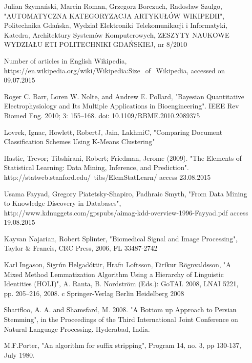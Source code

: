 \cleardoublepage
{}
{}
\begin{thebibliography}{99}

Julian Szymański, Marcin Roman, Grzegorz Borczuch, Radosław Szulgo, "AUTOMATYCZNA KATEGORYZACJA ARTYKUŁÓW WIKIPEDII", Politechnika Gdańska, Wydział Elektroniki Telekomunikacji i Informatyki, Katedra, Architektury Systemów Komputerowych, ZESZYTY NAUKOWE WYDZIAŁU ETI POLITECHNIKI GDAŃSKIEJ, nr 8/2010

Number of articles in English Wikipedia, https://en.wikipedia.org/wiki/Wikipedia:Size\_of\_Wikipedia, accessed on 09.07.2015

Roger C. Barr, Loren W. Nolte, and Andrew E. Pollard, "Bayesian Quantitative Electrophysiology and Its Multiple Applications in Bioengineering". IEEE Rev Biomed Eng. 2010; 3: 155–168.
doi:  10.1109/RBME.2010.2089375

Lovrek, Ignac, Howlett, RobertJ, Jain, LakhmiC, "Comparing Document Classification Schemes Using K-Means Clustering"

Hastie, Trevor; Tibshirani, Robert; Friedman, Jerome (2009). "The Elements of Statistical Learning: Data Mining, Inference, and Prediction". http://statweb.stanford.edu/~tibs/ElemStatLearn/ access 23.08.2015

Usama Fayyad, Gregory Piatetsky-Shapiro, Padhraic Smyth, "From Data Mining to Knowledge Discovery in Databases", http://www.kdnuggets.com/gpspubs/aimag-kdd-overview-1996-Fayyad.pdf access 19.08.2015

Kayvan Najarian, Robert Splinter, "Biomedical Signal and Image Processing", Taylor \& Francis, CRC Press, 2006, FL 33487-2742

Karl Ingason, Sigrún Helgadóttir, Hrafn Loftsson, Eiríkur Rögnvaldsson, "A Mixed Method Lemmatization Algorithm
Using a Hierarchy of Linguistic Identities (HOLI)", A. Ranta, B. Nordström (Eds.): GoTAL 2008, LNAI 5221, pp. 205–216, 2008.
c Springer-Verlag Berlin Heidelberg 2008

Sharifloo, A. A. and Shamsfard, M. 2008. "A Bottom up Approach to Persian Stemming", in the Proceedings of the Third International Joint Conference on Natural Language Processing. Hyderabad, India.

M.F.Porter, "An algorithm for suffix stripping", Program 14, no. 3, pp 130-137, July 1980.


\end{thebibliography}
